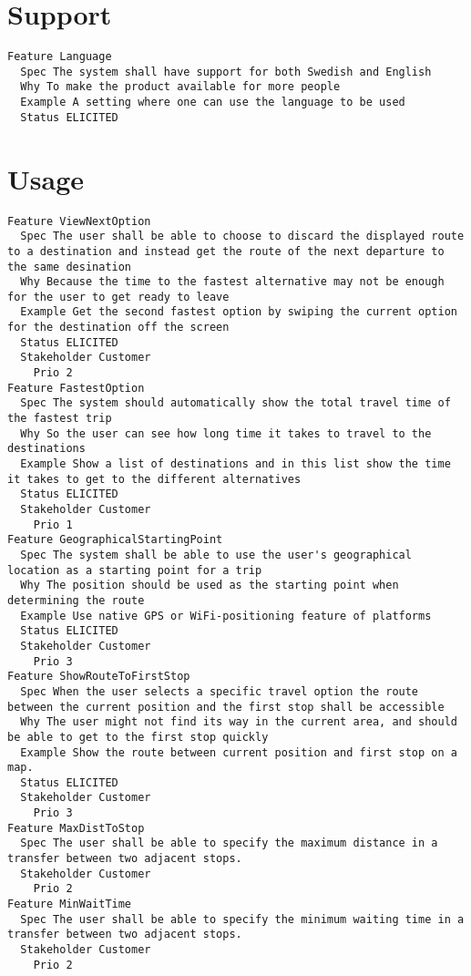         
       \section{Support}


\begin{lstlisting}
Feature Language
  Spec The system shall have support for both Swedish and English
  Why To make the product available for more people
  Example A setting where one can use the language to be used
  Status ELICITED

\end{lstlisting}
    
        
       \section{Usage}


\begin{lstlisting}
Feature ViewNextOption
  Spec The user shall be able to choose to discard the displayed route to a destination and instead get the route of the next departure to the same desination
  Why Because the time to the fastest alternative may not be enough for the user to get ready to leave
  Example Get the second fastest option by swiping the current option for the destination off the screen
  Status ELICITED
  Stakeholder Customer
    Prio 2
Feature FastestOption
  Spec The system should automatically show the total travel time of the fastest trip
  Why So the user can see how long time it takes to travel to the destinations
  Example Show a list of destinations and in this list show the time it takes to get to the different alternatives
  Status ELICITED
  Stakeholder Customer
    Prio 1
Feature GeographicalStartingPoint
  Spec The system shall be able to use the user's geographical location as a starting point for a trip
  Why The position should be used as the starting point when determining the route
  Example Use native GPS or WiFi-positioning feature of platforms
  Status ELICITED
  Stakeholder Customer
    Prio 3
Feature ShowRouteToFirstStop
  Spec When the user selects a specific travel option the route between the current position and the first stop shall be accessible
  Why The user might not find its way in the current area, and should be able to get to the first stop quickly
  Example Show the route between current position and first stop on a map.
  Status ELICITED
  Stakeholder Customer
    Prio 3
Feature MaxDistToStop
  Spec The user shall be able to specify the maximum distance in a transfer between two adjacent stops.
  Stakeholder Customer
    Prio 2
Feature MinWaitTime
  Spec The user shall be able to specify the minimum waiting time in a transfer between two adjacent stops.
  Stakeholder Customer
    Prio 2

\end{lstlisting}
    
